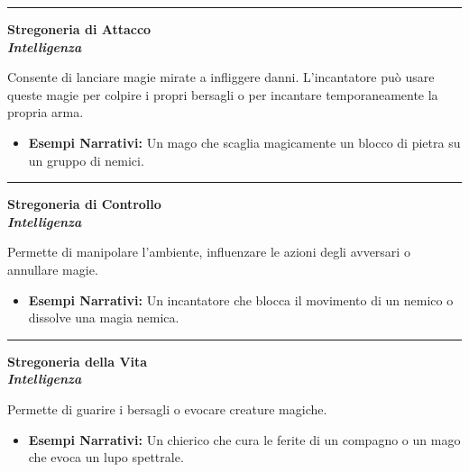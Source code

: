 \documentclass[../manuale_main.tex]{subfiles}
\begin{document}
\vspace{0.5cm}\rule{\textwidth}{0.4pt}\vspace{0.5cm}

\begin{center}
\textbf{\large{Stregoneria di Attacco}}\\ \textit{\textbf{Intelligenza}}\\
\end{center}
Consente di lanciare magie mirate a infliggere danni. L'incantatore può usare queste magie per colpire i propri bersagli o per incantare temporaneamente la propria arma.

\begin{itemize}
\item \textbf{Esempi Narrativi:} Un mago che scaglia magicamente un blocco di pietra su un gruppo di nemici.
\end{itemize}

\vspace{0.5cm}\rule{\textwidth}{0.4pt}\vspace{0.5cm}

\begin{center}
\textbf{\large{Stregoneria di Controllo}}\\ \textit{\textbf{Intelligenza}}\\
\end{center}
Permette di manipolare l’ambiente, influenzare le azioni degli avversari o annullare magie.

\begin{itemize}
\item \textbf{Esempi Narrativi:} Un incantatore che blocca il movimento di un nemico o dissolve una magia nemica.
\end{itemize}

\vspace{0.5cm}\rule{\textwidth}{0.4pt}\vspace{0.5cm}

\begin{center}
\textbf{\large{Stregoneria della Vita}}\\ \textit{\textbf{Intelligenza}}\\
\end{center}
Permette di guarire i bersagli o evocare creature magiche.

\begin{itemize}
\item \textbf{Esempi Narrativi:} Un chierico che cura le ferite di un compagno o un mago che evoca un lupo spettrale.
\end{itemize}
\end{document}
